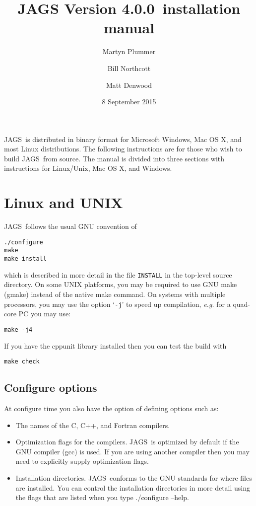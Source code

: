 \documentclass[11pt, a4paper, titlepage]{article}
\newcommand{\release}{4.0.0}
\newcommand{\JAGS}{\textsf{JAGS}}
\newcommand{\code}[1]{{\bgroup{\normalfont\ttfamily #1}\egroup}}
\newcommand{\samp}[1]{{`\bgroup\normalfont\texttt{#1}'\egroup}}
\let\command=\code
\let\option=\samp
\begin{document}
\title{JAGS Version \release\ installation manual}
\author{Martyn Plummer \and Bill Northcott \and Matt Denwood}
\date{8 September 2015}
\maketitle

\JAGS\ is distributed in binary format for Microsoft Windows, Mac OS
X, and most Linux distributions.  The following instructions are for
those who wish to build \JAGS\ from source. The manual is divided
into three sections with instructions for Linux/Unix, Mac OS X, and Windows.

\section{Linux and UNIX}

\JAGS\ follows the usual GNU convention of 
\begin{verbatim}
./configure
make
make install
\end{verbatim}
which is described in more detail in the file \texttt{INSTALL} in
the top-level source directory. On some UNIX platforms, you may
be required to use GNU make (gmake) instead of the native make
command. On systems with multiple processors, you may use the option 
\option{-j} to speed up compilation, {\em e.g.} for a quad-core PC you
may use:
\begin{verbatim}
make -j4
\end{verbatim}
If you have the cppunit library installed then you can test the build with
\begin{verbatim}
make check
\end{verbatim}

\subsection{Configure options}

At configure time you also have the option of defining options such
as:
\begin{itemize}
\item The names of the C, C++, and Fortran compilers.  
\item Optimization flags for the compilers.  \JAGS\ is optimized by
  default if the GNU compiler (gcc) is used. If you are using another
  compiler then you may need to explicitly supply optimization flags.
\item Installation directories. \JAGS\ conforms to the GNU standards
  for where files are installed. You can control the installation
  directories in more detail using the flags that are listed when
  you type \command{./configure --help}.
\end{itemize}
\end{document}
